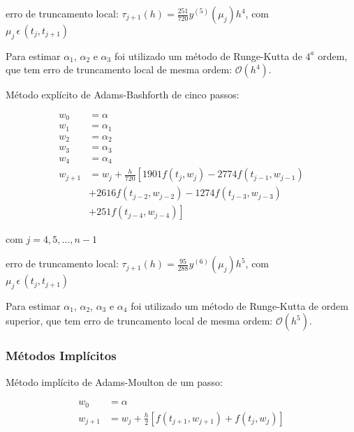 \documentclass[final,5p]{elsarticle}
\numberwithin{equation}{section}
\begin{document}
        \noindent erro de truncamento local: $\tau_{j+1}(h) = \frac{251}{720}y^{(5)}(\mu_j)h^4$, com \\ $\mu_j \, \epsilon \, (t_j,t_{j+1})$

        Para estimar $\alpha_1$, $\alpha_2$ e $\alpha_3$ foi utilizado um método de Runge-Kutta de $4^a$ ordem, que tem erro de truncamento local de mesma ordem: $\mathcal{O}(h^4)$.

        Método explícito de Adams-Bashforth de cinco passos:

        \begin{align}
            w_0 &= \alpha \nonumber \\
            w_1 &= \alpha_1 \nonumber \\
            w_2 &= \alpha_2 \nonumber \\
            w_3 &= \alpha_3 \nonumber \\
            w_4 &= \alpha_4 \nonumber \\
            w_{j+1} &= w_j + \frac{h}{720} \left[ 1901 f(t_j, w_j) - 2774 f(t_{j-1}, w_{j-1}) \right. \nonumber \\
            & + 2616 f(t_{j-2}, w_{j-2}) - 1274 f(t_{j-3}, w_{j-3}) \nonumber \\
            &\left.+ 251 f(t_{j-4}, w_{j-4})\right] \label{eq:adamsbashforth5}
        \end{align}

        \noindent com $j=4,5,\ldots,n-1$

        \noindent erro de truncamento local: $\tau_{j+1}(h) = \frac{95}{288}y^{(6)}(\mu_j)h^5$, com \\ $\mu_j \, \epsilon \, (t_j,t_{j+1})$

        Para estimar $\alpha_1$, $\alpha_2$, $\alpha_3$ e $\alpha_4$ foi utilizado um método de Runge-Kutta de ordem superior, que tem erro de truncamento local de mesma ordem: $\mathcal{O}(h^5)$.

    \subsubsection{Métodos Implícitos}

        Método implícito de Adams-Moulton de um passo:

        \begin{align}
            w_0 &= \alpha \nonumber \\
            w_{j+1} &= w_j + \frac{h}{2} \left[ f(t_{j+1}, w_{j+1}) + f(t_j, w_j) \right] \label{eq:adamsmoulton1}
        \end{align}
\end{document}
